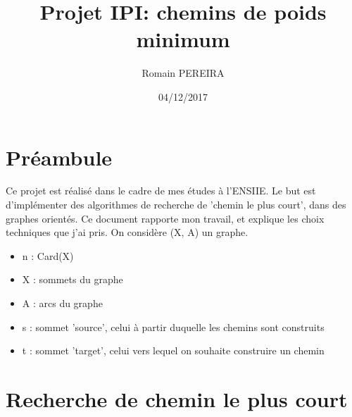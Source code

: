 \documentclass[10pt]{article}
\title{Projet IPI: chemins de poids minimum}
\author{Romain PEREIRA}
\date{04/12/2017}
\begin{document}
	\maketitle
	\tableofcontents

	\section*{Préambule}
		Ce projet est réalisé dans le cadre de mes études à l'ENSIIE.\newline
		Le but est d'implémenter des algorithmes de recherche de 'chemin le plus court', dans des graphes orientés.\newline
		Ce document rapporte mon travail, et explique les choix techniques que j'ai pris.\newline\newline
		On considère (X, A) un graphe.
		\begin{itemize}[label=-]
			\item n : Card(X)
			\item X : sommets du graphe
			\item A : arcs du graphe
			\item s : sommet 'source', celui à partir duquelle les chemins sont construits
			\item t : sommet 'target', celui vers lequel on souhaite construire un chemin
		\end{itemize}
		
	\newpage
	\section{Recherche de chemin le plus court}
\end{document}
